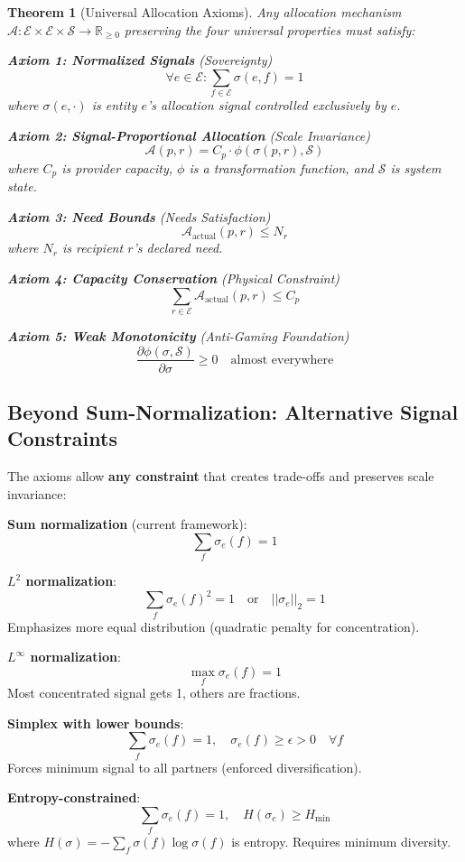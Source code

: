 \documentclass[11pt,a4paper]{article}
\newtheorem{theorem}{Theorem}[section]
\theoremstyle{definition}
\theoremstyle{remark}
\newcommand{\E}{\mathcal{E}}
\begin{document}
\begin{theorem}[Universal Allocation Axioms]
Any allocation mechanism $\mathcal{A}: \E \times \E \times \mathcal{S} \to \mathbb{R}_{\ge 0}$ preserving the four universal properties must satisfy:

\textbf{Axiom 1: Normalized Signals} (Sovereignty)
\[ \forall e \in \E: \sum_{f \in \E} \sigma(e,f) = 1 \]
where $\sigma(e,\cdot)$ is entity $e$'s allocation signal controlled exclusively by $e$.

\textbf{Axiom 2: Signal-Proportional Allocation} (Scale Invariance)
\[ \mathcal{A}(p,r) = C_p \cdot \phi(\sigma(p,r), \mathcal{S}) \]
where $C_p$ is provider capacity, $\phi$ is a transformation function, and $\mathcal{S}$ is system state.

\textbf{Axiom 3: Need Bounds} (Needs Satisfaction)
\[ \mathcal{A}_{\text{actual}}(p,r) \le N_r \]
where $N_r$ is recipient $r$'s declared need.

\textbf{Axiom 4: Capacity Conservation} (Physical Constraint)
\[ \sum_{r \in \E} \mathcal{A}_{\text{actual}}(p,r) \le C_p \]

\textbf{Axiom 5: Weak Monotonicity} (Anti-Gaming Foundation)
\[ \frac{\partial \phi(\sigma, \mathcal{S})}{\partial \sigma} \ge 0 \quad \text{almost everywhere} \]
\end{theorem}

\subsection{Beyond Sum-Normalization: Alternative Signal Constraints}

The axioms allow \textbf{any constraint} that creates trade-offs and preserves scale invariance:

\textbf{Sum normalization} (current framework):
\[ \sum_f \sigma_e(f) = 1 \]

\textbf{$L^2$ normalization}:
\[ \sum_f \sigma_e(f)^2 = 1 \quad \text{or} \quad ||\sigma_e||_2 = 1 \]
Emphasizes more equal distribution (quadratic penalty for concentration).

\textbf{$L^\infty$ normalization}:
\[ \max_f \sigma_e(f) = 1 \]
Most concentrated signal gets 1, others are fractions.

\textbf{Simplex with lower bounds}:
\[ \sum_f \sigma_e(f) = 1, \quad \sigma_e(f) \ge \epsilon > 0 \quad \forall f \]
Forces minimum signal to all partners (enforced diversification).

\textbf{Entropy-constrained}:
\[ \sum_f \sigma_e(f) = 1, \quad H(\sigma_e) \ge H_{\min} \]
where $H(\sigma) = -\sum_f \sigma(f) \log \sigma(f)$ is entropy. Requires minimum diversity.
\end{document}
